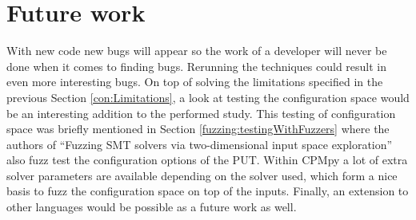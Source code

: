 


\section{Future work}
\label{con:FutureWork}
With new code new bugs will appear so the work of a developer will never be done when it comes to finding bugs. Rerunning the techniques could result in even more interesting bugs. 
On top of solving the limitations specified in the previous Section \ref{con:Limitations},
a look at testing the configuration space would be an interesting addition to the performed study. This testing of configuration space was briefly mentioned in Section \ref{fuzzing:testingWithFuzzers} where the authors of “Fuzzing SMT solvers via two-dimensional input space exploration” \cite{42FalconFuzzingConfigurationSettingsAndNormal} also fuzz test the configuration options of the PUT. Within CPMpy a lot of extra solver parameters are available depending on the solver used, which form a nice basis to fuzz the configuration space on top of the inputs.
Finally, an extension to other languages would be possible as a future work as well.


